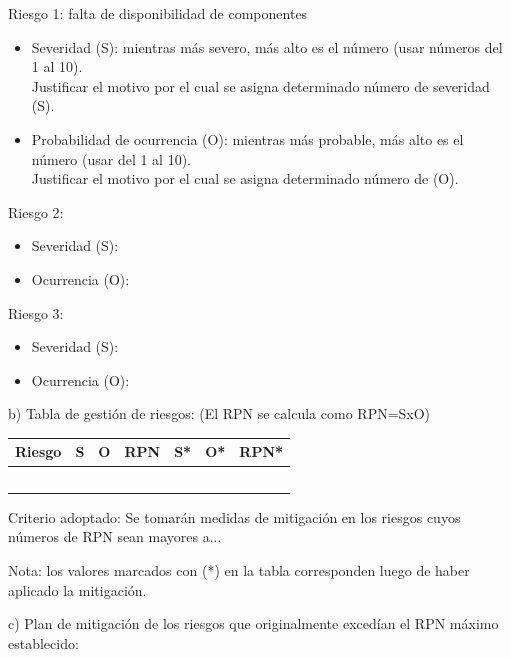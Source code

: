 \documentclass[
11pt, %
]{charter}
\begin{document}
 
Riesgo 1: falta de disponibilidad de componentes
\begin{itemize}
	\item Severidad (S): mientras más severo, más alto es el número (usar números del 1 al 10).\\
	Justificar el motivo por el cual se asigna determinado número de severidad (S).
	\item Probabilidad de ocurrencia (O): mientras más probable, más alto es el número (usar del 1 al 10).\\
	Justificar el motivo por el cual se asigna determinado número de (O). 
\end{itemize}   

Riesgo 2:
\begin{itemize}
	\item Severidad (S): 
	\item Ocurrencia (O):
\end{itemize}

Riesgo 3:
\begin{itemize}
	\item Severidad (S): 
	\item Ocurrencia (O):
\end{itemize}


b) Tabla de gestión de riesgos:      (El RPN se calcula como RPN=SxO)

\begin{table}[htpb]
\centering
\begin{tabularx}{\linewidth}{@{}|X|c|c|c|c|c|c|@{}}
\hline
\rowcolor[HTML]{C0C0C0} 
Riesgo & S & O & RPN & S* & O* & RPN* \\ \hline
       &   &   &     &    &    &      \\ \hline
       &   &   &     &    &    &      \\ \hline
       &   &   &     &    &    &      \\ \hline
       &   &   &     &    &    &      \\ \hline
       &   &   &     &    &    &      \\ \hline
\end{tabularx}%
\end{table}

Criterio adoptado: 
Se tomarán medidas de mitigación en los riesgos cuyos números de RPN sean mayores a...

Nota: los valores marcados con (*) en la tabla corresponden luego de haber aplicado la mitigación.

c) Plan de mitigación de los riesgos que originalmente excedían el RPN máximo establecido:
 
\end{document}
